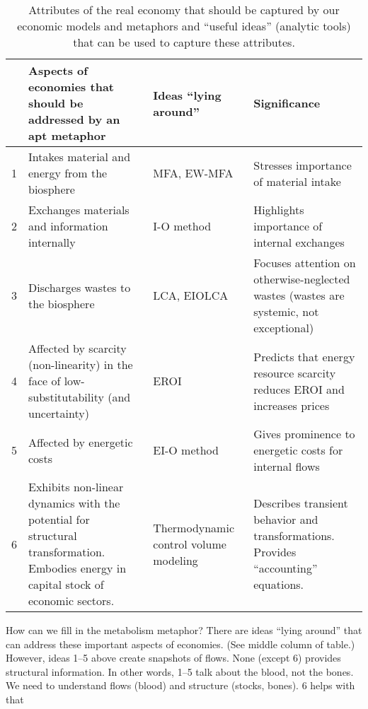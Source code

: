 \begin{table}
\label{tab:metabolic_economy}
\caption{Attributes of the real economy that should be captured by our economic models and metaphors 
				and ``useful ideas'' (analytic tools) that can be used to capture these attributes.}
\begin{tabular}{p{0.5cm}p{5cm}p{2.2cm}p{4cm}}
\hline
																													&	
	Aspects of economies that should be addressed by an apt metaphor		&
	Ideas “lying around”																					&
	Significance																								\\
\hline
1																													&	
	Intakes material and energy from the biosphere										&
	MFA, EW-MFA																							&
	Stresses importance of material intake													\\
2																													&
	Exchanges materials and information internally										&
	I-O method																								&
	Highlights importance of internal exchanges											\\
3																													&
	Discharges wastes to the biosphere															&
	LCA, EIOLCA																								&
	Focuses attention on otherwise-neglected wastes 
		(wastes are systemic, not exceptional)												\\
4																													&
	Affected by scarcity (non-linearity) in the face of 
		low-substitutability (and uncertainty)													&
		EROI																										&
		Predicts that energy resource scarcity reduces EROI 
			and increases prices																			\\
5																													&
	Affected by energetic costs																		&
	EI-O method																								&
	Gives prominence to energetic costs for internal flows							\\
6																													&
	Exhibits non-linear dynamics with 
		the potential for structural transformation.
		Embodies energy in capital stock of economic sectors.						&
	Thermodynamic control volume modeling												&
	Describes transient behavior and transformations.
		Provides “accounting” equations.															\\
\hline
\end{tabular}
\end{table}

How can we fill in the metabolism metaphor? There are ideas “lying around” that can address these important aspects of economies. (See middle column of table.) However, ideas 1–5 above create snapshots of flows. None (except 6) provides structural information. In other words, 1–5 talk about the blood, not the bones. We need to understand flows (blood) and structure (stocks, bones). 6 helps with that

